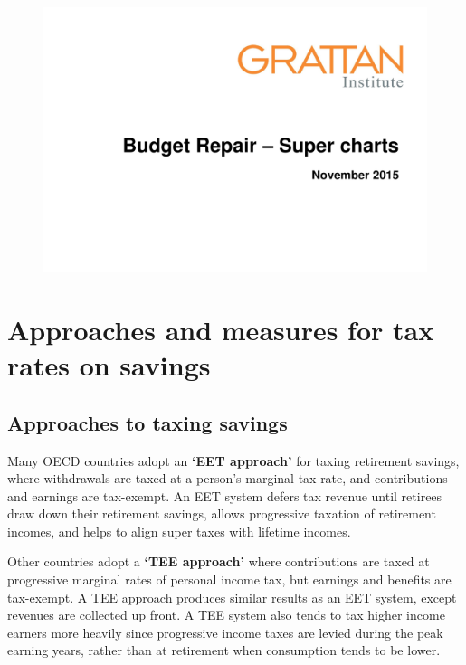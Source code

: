 \documentclass{grattanAlpha}
\begin{document}
\begin{figure}
\label{fig:SUPER-B-2}
\includegraphics[width=\columnwidth,page=50]{super-atlas/PPTX.pdf}
\end{figure}  



\chapter{Approaches and measures for tax rates on savings}\label{appendix:SUPER-approaches-measures-for-tax-rates-on-savings}\label{appendix:SUPER-C}
\section{Approaches to taxing savings\label{appendix:SUPER-C-1}}
Many OECD countries adopt an \textbf{‘EET approach’} for taxing retirement savings, where withdrawals are taxed at a person’s marginal tax rate, and contributions and earnings are tax-exempt. An EET system defers tax revenue until retirees draw down their retirement savings, allows progressive taxation of retirement incomes, and helps to align super taxes with lifetime incomes.

Other countries adopt a \textbf{‘TEE approach’} where contributions are taxed at progressive marginal rates of personal income tax, but earnings and benefits are tax-exempt. A TEE approach produces similar results as an EET system, except revenues are collected up front. A TEE system also tends to tax higher income earners more heavily since progressive income taxes are levied during the peak earning years, rather than at retirement when consumption tends to be lower. 
\end{document}
